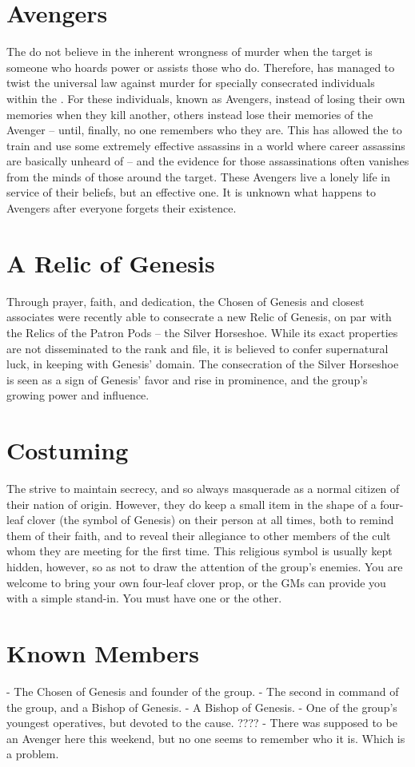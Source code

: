 \documentclass[blue]{GL2020}
\begin{document}
\section*{Avengers}
The \pGoaties{} do not believe in the inherent wrongness of murder when the target is someone who hoards power or assists those who do. Therefore, \cGenesis{} has managed to twist the universal law against murder for specially consecrated individuals within the \pGoaties{}. For these individuals, known as Avengers, instead of losing their own memories when they kill another, others instead lose their memories of the Avenger -- until, finally, no one remembers who they are. This has allowed the \pGoaties{} to train and use some extremely effective assassins in a world where career assassins are basically unheard of -- and the evidence for those assassinations often vanishes from the minds of those around the target. These Avengers live a lonely life in service of their beliefs, but an effective one. It is unknown what happens to Avengers after everyone forgets their existence.

\section*{A Relic of Genesis}
Through prayer, faith, and dedication, the Chosen of Genesis and \cChupLeader{\their} closest associates were recently able to consecrate a new Relic of Genesis, on par with the Relics of the Patron Pods – the Silver Horseshoe. While its exact properties are not disseminated to the rank and file, it is believed to confer supernatural luck, in keeping with Genesis’ domain. The consecration of the Silver Horseshoe is seen as a sign of Genesis’ favor and rise in prominence, and the group’s growing power and influence.

\section*{Costuming}
The \pGoaties{} strive to maintain secrecy, and so always masquerade as a normal citizen of their nation of origin. However, they do keep a small item in the shape of a four-leaf clover (the symbol of Genesis) on their person at all times, both to remind them of their faith, and to reveal their allegiance to other members of the cult whom they are meeting for the first time. This religious symbol is usually kept hidden, however, so as not to draw the attention of the group’s enemies. You are welcome to bring your own four-leaf clover prop, or the GMs can provide you with a simple stand-in. You must have one or the other.

\section*{Known Members}
\cChupLeader{} - The Chosen of Genesis and founder of the group.
\cChupSecond{} - The second in command of the group, and a Bishop of Genesis.
\cChupInventor{} - A Bishop of Genesis.
\cChupStudent{} - One of the group’s youngest operatives, but devoted to the cause.
???? - There was supposed to be an Avenger here this weekend, but no one seems to remember who it is. Which is a problem.
\end{document}
